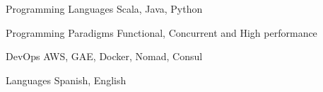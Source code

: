 


\begin{cvskills}






\cvskill
{Programming Languages} %
{Scala, Java, Python} %


\cvskill
{Programming Paradigms} %
{Functional, Concurrent and High performance} %


\cvskill
{DevOps} %
{AWS, GAE, Docker, Nomad, Consul} %


\cvskill
{Languages} %
{Spanish, English} %




\end{cvskills}

